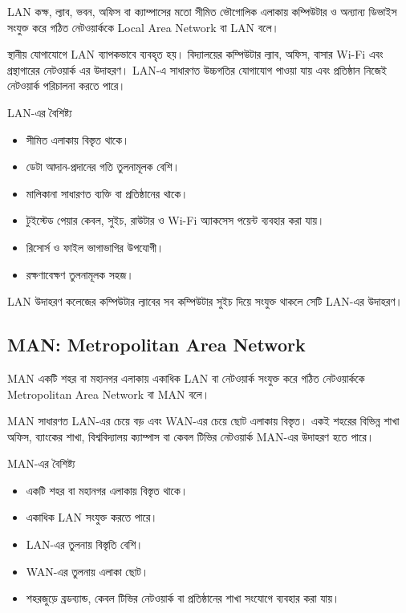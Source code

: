 \begin{definitionbox}{LAN}
কক্ষ, ল্যাব, ভবন, অফিস বা ক্যাম্পাসের মতো সীমিত ভৌগোলিক এলাকায় কম্পিউটার ও অন্যান্য ডিভাইস সংযুক্ত করে গঠিত নেটওয়ার্ককে Local Area Network বা LAN বলে।
\end{definitionbox}

স্থানীয় যোগাযোগে LAN ব্যাপকভাবে ব্যবহৃত হয়। বিদ্যালয়ের কম্পিউটার ল্যাব, অফিস, বাসার Wi-Fi এবং গ্রন্থাগারের নেটওয়ার্ক এর উদাহরণ। LAN-এ সাধারণত উচ্চগতির যোগাযোগ পাওয়া যায় এবং প্রতিষ্ঠান নিজেই নেটওয়ার্ক পরিচালনা করতে পারে।

\begin{keypointbox}{LAN-এর বৈশিষ্ট্য}
\begin{itemize}
\item সীমিত এলাকায় বিস্তৃত থাকে।
\item ডেটা আদান-প্রদানের গতি তুলনামূলক বেশি।
\item মালিকানা সাধারণত ব্যক্তি বা প্রতিষ্ঠানের থাকে।
\item টুইস্টেড পেয়ার কেবল, সুইচ, রাউটার ও Wi-Fi অ্যাকসেস পয়েন্ট ব্যবহার করা যায়।
\item রিসোর্স ও ফাইল ভাগাভাগির উপযোগী।
\item রক্ষণাবেক্ষণ তুলনামূলক সহজ।
\end{itemize}
\end{keypointbox}

\begin{examplebox}{LAN উদাহরণ}
কলেজের কম্পিউটার ল্যাবের সব কম্পিউটার সুইচ দিয়ে সংযুক্ত থাকলে সেটি LAN-এর উদাহরণ।
\end{examplebox}

\subsection{MAN: Metropolitan Area Network}

\begin{definitionbox}{MAN}
একটি শহর বা মহানগর এলাকায় একাধিক LAN বা নেটওয়ার্ক সংযুক্ত করে গঠিত নেটওয়ার্ককে Metropolitan Area Network বা MAN বলে।
\end{definitionbox}

MAN সাধারণত LAN-এর চেয়ে বড় এবং WAN-এর চেয়ে ছোট এলাকায় বিস্তৃত। একই শহরের বিভিন্ন শাখা অফিস, ব্যাংকের শাখা, বিশ্ববিদ্যালয় ক্যাম্পাস বা কেবল টিভির নেটওয়ার্ক MAN-এর উদাহরণ হতে পারে।

\begin{keypointbox}{MAN-এর বৈশিষ্ট্য}
\begin{itemize}
\item একটি শহর বা মহানগর এলাকায় বিস্তৃত থাকে।
\item একাধিক LAN সংযুক্ত করতে পারে।
\item LAN-এর তুলনায় বিস্তৃতি বেশি।
\item WAN-এর তুলনায় এলাকা ছোট।
\item শহরজুড়ে ব্রডব্যান্ড, কেবল টিভির নেটওয়ার্ক বা প্রতিষ্ঠানের শাখা সংযোগে ব্যবহার করা যায়।
\end{itemize}
\end{keypointbox}

